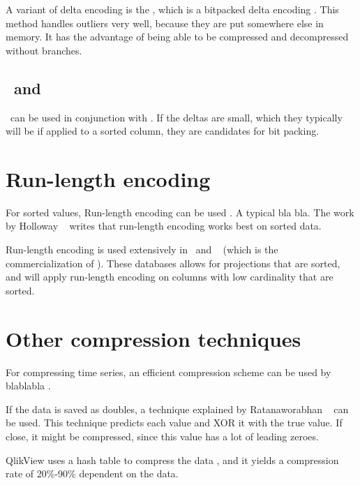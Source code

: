 A variant of delta encoding is the , which is a bitpacked delta encoding \cite{Bjorklund2011-wh}. This method handles outliers very well, because they are put somewhere else in memory. It has the advantage of being able to be compressed and decompressed without branches.

\subsection{\dele~and \bp}
\label{sub:Delta Encoding and Bitpacking}
\bp~can be used in conjunction with \dele. If the deltas are small, which they typically will be if applied to a sorted column, they are candidates for bit packing.

\section{Run-length encoding}
\label{sec:Run-length encoding}
For sorted values, Run-length encoding can be used \cite{Bjorklund2011-wh}. A typical bla bla. The work by Holloway \ea~\cite{Holloway2008-rr} writes that run-length encoding works best on sorted data.

Run-length encoding is used extensively in \cstore~and \vertica~\cite{Barber2012-xt} (which is the commercialization of \cstore). These databases allows for projections that are sorted, and will apply run-length encoding on columns with low cardinality that are sorted.
\section{Other compression techniques}
\label{sec:Other compression techniques}
For compressing time series, an efficient compression scheme can be used by blablabla \cite{Pelkonen2015-ko}.

If the data is saved as doubles, a technique explained by Ratanaworabhan \ea~\cite{Ratanaworabhan2006-jb} can be used. This technique predicts each value and XOR it with the true value. If close, it might be compressed, since this value has a lot of leading zeroes.

QlikView uses a hash table to compress the data \cite{Qlik2014-vd}, and it yields a compression rate of 20\%-90\% dependent on the data.
